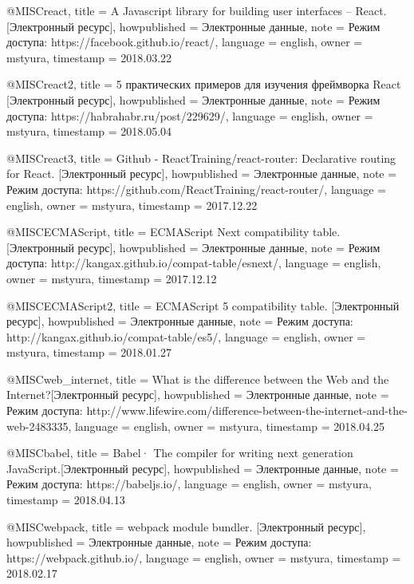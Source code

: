 @MISC{react,
  title = {A Javascript library for building user interfaces – React. [Электронный ресурс]},
  howpublished = {Электронные данные},
  note = {Режим доступа: https://facebook.github.io/react/},
  language = {english},
  owner = {mstyura},
  timestamp = {2018.03.22} 
  }

  @MISC{react2,
  title = {5 практических примеров для изучения фреймворка React [Электронный ресурс]},
  howpublished = {Электронные данные},
  note = {Режим доступа:  https://habrahabr.ru/post/229629/},
  language = {english},
  owner = {mstyura},
  timestamp = {2018.05.04} 
  }

@MISC{react3,
  title = {Github - ReactTraining/react-router: Declarative routing for React. [Электронный ресурс]},
  howpublished = {Электронные данные},
  note = {Режим доступа:  https://github.com/ReactTraining/react-router/},
  language = {english},
  owner = {mstyura},
  timestamp = {2017.12.22} 
  }

@MISC{ECMAScript,
  title = {ECMAScript Next compatibility table.  [Электронный ресурс]},
  howpublished = {Электронные данные},
  note = {Режим доступа: http://kangax.github.io/compat-table/esnext/},
  language = {english},
  owner = {mstyura},
  timestamp = {2017.12.12} 
  }

  @MISC{ECMAScript2,
  title = {ECMAScript 5 compatibility table. [Электронный ресурс]},
  howpublished = {Электронные данные},
  note = {Режим доступа: http://kangax.github.io/compat-table/es5/},
  language = {english},
  owner = {mstyura},
  timestamp = {2018.01.27} 
  }

  @MISC{web_internet,
  title = {What is the difference between the Web and the Internet?[Электронный ресурс]},
  howpublished = {Электронные данные},
  note = {Режим доступа: http://www.lifewire.com/difference-between-the-internet-and-the-web-2483335},
  language = {english},
  owner = {mstyura},
  timestamp = {2018.04.25} 
  }
  

   @MISC{babel,
  title = {Babel· The compiler for writing next generation JavaScript.[Электронный ресурс]},
  howpublished = {Электронные данные},
  note = {Режим доступа: https://babeljs.io/},
  language = {english},
  owner = {mstyura},
  timestamp = {2018.04.13} 
  }

   @MISC{webpack,
  title = {webpack module bundler. [Электронный ресурс]},
  howpublished = {Электронные данные},
  note = {Режим доступа: https://webpack.github.io/},
  language = {english},
  owner = {mstyura},
  timestamp = {2018.02.17} 
  }

